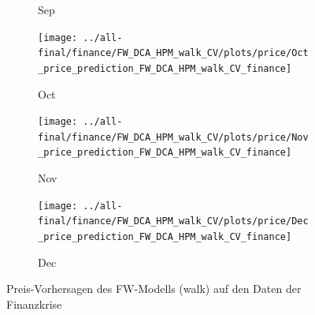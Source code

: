 \documentclass[ngerman]{ttlab-qualify}
\begin{document}
\begin{figure}[H]
\begin{subfigure}{.3\linewidth}
  \caption{Sep}
  \end{subfigure}\par\medskip
  \begin{subfigure}{.3\linewidth}
  \texttt{[image: ../all-final/finance/FW\_DCA\_HPM\_walk\_CV/plots/price/Oct\_price\_prediction\_FW\_DCA\_HPM\_walk\_CV\_finance]}\hfill
  \caption{Oct}
  \end{subfigure}
  \begin{subfigure}{.3\linewidth}
  \texttt{[image: ../all-final/finance/FW\_DCA\_HPM\_walk\_CV/plots/price/Nov\_price\_prediction\_FW\_DCA\_HPM\_walk\_CV\_finance]}\hfill
  \caption{Nov}
  \end{subfigure}
  \begin{subfigure}{.3\linewidth}
  \texttt{[image: ../all-final/finance/FW\_DCA\_HPM\_walk\_CV/plots/price/Dec\_price\_prediction\_FW\_DCA\_HPM\_walk\_CV\_finance]}\hfill
  \caption{Dec}
  \end{subfigure}
  \caption{Preis-Vorhersagen des FW-Modells (walk) auf den Daten der Finanzkrise}
\end{figure}
\end{document}
